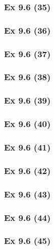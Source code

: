 \subsubsection{Ex 9.6 (35)}\label{sec:Ex_9.6.35}

\subsubsection{Ex 9.6 (36)}\label{sec:Ex_9.6.36}

\subsubsection{Ex 9.6 (37)}\label{sec:Ex_9.6.37}

\subsubsection{Ex 9.6 (38)}\label{sec:Ex_9.6.38}

\subsubsection{Ex 9.6 (39)}\label{sec:Ex_9.6.39}

\subsubsection{Ex 9.6 (40)}\label{sec:Ex_9.6.40}

\newpage		%

\subsubsection{Ex 9.6 (41)}\label{sec:Ex_9.6.41}

\subsubsection{Ex 9.6 (42)}\label{sec:Ex_9.6.42}

\subsubsection{Ex 9.6 (43)}\label{sec:Ex_9.6.43}

\subsubsection{Ex 9.6 (44)}\label{sec:Ex_9.6.44}

\subsubsection{Ex 9.6 (45)}\label{sec:Ex_9.6.45}





